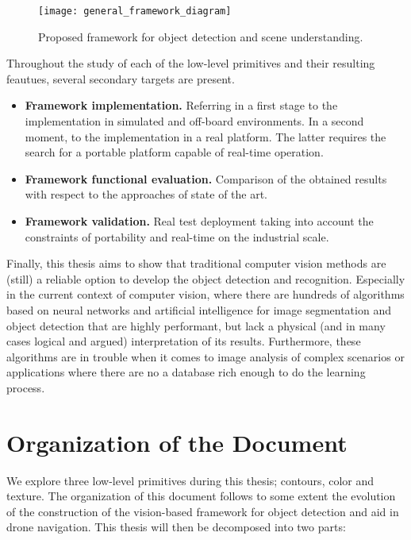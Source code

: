 \begin{figure}[!ht]
    \centering
    \texttt{[image: general\_framework\_diagram]}        
    \caption{Proposed framework for object detection and scene understanding.}\label{fig:general_diagram_framework}
\end{figure}

Throughout the study of each of the low-level primitives and their resulting feautues, several secondary targets are present.

\begin{itemize}
	\item \textbf{Framework implementation.} Referring in a first stage to the implementation in simulated and off-board environments. In a second moment, to the implementation in a real platform. The latter requires the search for a portable platform capable of real-time operation.
 
	\item \textbf{Framework functional evaluation.} Comparison of the obtained results with respect to the approaches of state of the art.
 
 	\item \textbf{Framework validation.} Real test deployment taking into account the constraints of portability and real-time on the industrial scale.
 
\end{itemize}

Finally, this thesis aims to show that traditional computer vision methods are (still) a reliable option to develop the object detection and recognition. Especially in the current context of computer vision, where there are hundreds of algorithms based on neural networks and artificial intelligence for image segmentation and object detection that are highly performant, but lack a physical (and in many cases logical and argued) interpretation of its results. Furthermore, these algorithms are in trouble when it comes to image analysis of complex scenarios or applications where there are no a database rich enough to do the learning process.


\section*{Organization of the Document}
We explore three low-level primitives during this thesis; contours, color and texture. The organization of this document follows to some extent the evolution of the construction of the vision-based framework for object detection and aid in drone navigation. This thesis will then be decomposed into two parts:

